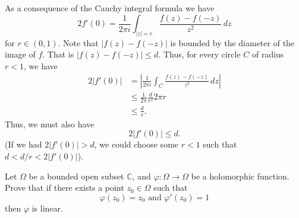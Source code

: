 \documentclass[12 pt, letterpaper]{hmcpset}
\begin{document}
\begin{solution}
	As a consequence of the Cauchy integral formula we have
	\[
		2 f'(0) = \frac{1}{2 \pi i} \int_{\lvert z \rvert = r} \frac{f(z) - f(-z)}{z^{2}} \, dz
	\]
	for $r \in (0, 1)$. Note that $\lvert f(z) - f(-z) \rvert$ is bounded by the diameter of the image of $f$. That is $\lvert f(z) - f(-z) \rvert \le d$. Thus, for every circle $C$ of radius $r < 1$, we have
	\[
		\begin{split}
			2 \lvert f'(0) \rvert & = \left \lvert \frac{1}{2 \pi i} \int_{C} \frac{f(z) - f(-z)}{z^{2}} \, dz  \right \rvert \\
					      & \le \frac{1}{2 \pi} \frac{d}{r^{2}} 2 \pi r \\
					      & \le \frac{d}{r}.
		\end{split}
	\]
	Thus, we must also have
	\[
		2 \lvert f'(0) \rvert \le d.
	\]
	(If we had $2\lvert f'(0) \rvert > d$, we could choose some $r < 1$ such that $d < d / r < 2 \lvert f'(0) \rvert$).
\end{solution}

\pagebreak

\begin{problem}[9.]
	Let $\Omega$ be a bounded open subset $\mathbb{C}$, and $\varphi : \Omega \to \Omega$ be a holomorphic function. Prove that if there exists a point $z_{0} \in \Omega$ such that
	\[
		\varphi(z_{0}) = z_{0} \text{ and } \varphi'(z_{0}) = 1
	\]
	then $\varphi$ is linear.
\end{problem}
\end{document}
